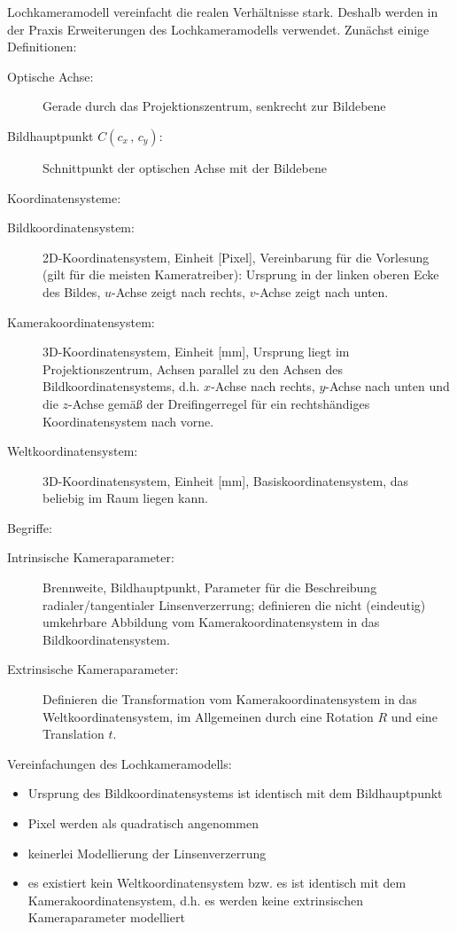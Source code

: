 Lochkameramodell vereinfacht die realen Verhältnisse stark. Deshalb werden in der Praxis Erweiterungen des Lochkameramodells verwendet. Zunächst einige Definitionen:
\begin{description}
\item[Optische Achse:] Gerade durch das Projektionszentrum, senkrecht zur Bildebene
\item[Bildhauptpunkt $C(c_x \, , \, c_y)$:] Schnittpunkt der optischen Achse mit der Bildebene
\end{description}
Koordinatensysteme:
\begin{description}
\item[Bildkoordinatensystem:] 2D-Koordinatensystem, Einheit [Pixel], Vereinbarung für die Vorlesung (gilt für die meisten Kameratreiber): Ursprung in der linken oberen Ecke des Bildes, $u$-Achse zeigt nach rechts, $v$-Achse zeigt nach unten.
\item[Kamerakoordinatensystem:] 3D-Koordinatensystem, Einheit [mm], Ursprung liegt im Projektionszentrum, Achsen parallel zu den Achsen des Bildkoordinatensystems, d.h. $x$-Achse nach rechts, $y$-Achse nach unten und die $z$-Achse gemäß der Dreifingerregel für ein rechtshändiges Koordinatensystem nach vorne.
\item[Weltkoordinatensystem:] 3D-Koordinatensystem, Einheit [mm], Basiskoordinatensystem, das beliebig im Raum liegen kann.
\end{description}
Begriffe:
\begin{description}
\item[Intrinsische Kameraparameter:] Brennweite, Bildhauptpunkt, Parameter für die Beschreibung radialer/tangentialer Linsenverzerrung; definieren die nicht (eindeutig) umkehrbare Abbildung vom Kamerakoordinatensystem in das Bildkoordinatensystem.
\item[Extrinsische Kameraparameter:] Definieren die Transformation vom Kamerakoordinatensystem in das Weltkoordinatensystem, im Allgemeinen durch eine Rotation $R$ und eine Translation $t$.
\end{description}
Vereinfachungen des Lochkameramodells:
\begin{itemize}
\item Ursprung des Bildkoordinatensystems ist identisch mit dem Bildhauptpunkt
\item Pixel werden als quadratisch angenommen
\item keinerlei Modellierung der Linsenverzerrung
\item es existiert kein Weltkoordinatensystem bzw. es ist identisch mit dem Kamerakoordinatensystem, d.h. es werden keine extrinsischen Kameraparameter modelliert
\end{itemize}
